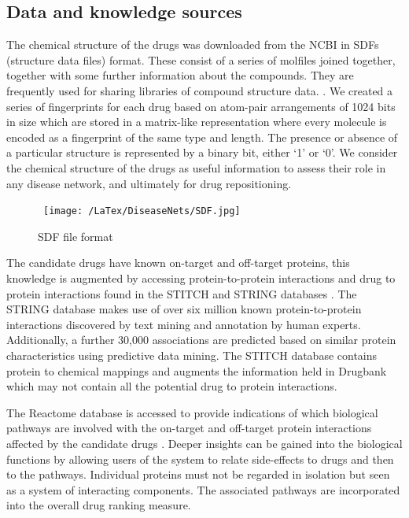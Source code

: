 \documentclass[authoryear,10pt,preprint]{elsarticle}
\begin{document}
\subsection{Data and knowledge sources}
The chemical structure of the drugs was downloaded from the NCBI in SDFs (structure data files) format. These consist of a series of molfiles joined together, together with some further information about the compounds. They are frequently used for sharing libraries of compound structure data. \cite{Weininger1988}. We created a series of fingerprints for each drug based on atom-pair arrangements of 1024 bits in size which are stored in a matrix-like representation where every molecule is encoded as a fingerprint of the same type and length. The presence or absence of a particular structure is represented by a binary bit, either `1' or `0'. We consider the chemical structure of the drugs as useful information to assess their role in any disease network, and ultimately for drug repositioning.

\begin{figure}[ht]
  \begin{center}              %
    \  \texttt{[image: /LaTex/DiseaseNets/SDF.jpg]} %
  \end{center}
 \caption{SDF file format}
\label{sdf}
\end{figure}



The candidate drugs have known on-target and off-target proteins, this knowledge is augmented by accessing protein-to-protein interactions and drug to protein interactions found in the STITCH and STRING databases \cite{Kuhn2012}. The STRING database  makes use of over six million known protein-to-protein interactions discovered by text mining and annotation by human experts. Additionally,  a further 30,000 associations are predicted based on similar protein characteristics using predictive data mining. The STITCH database contains protein to chemical mappings and augments the information held in Drugbank which may not contain all the potential drug to protein interactions. 

The Reactome database is accessed to provide indications of which biological pathways are involved with the on-target and off-target protein interactions affected by the candidate drugs \cite{Yu2015c}. Deeper insights can be gained into the biological functions by allowing users of the system to relate side-effects to drugs and then to the pathways. Individual proteins must not be regarded in isolation but seen as a system of interacting components. The associated pathways are incorporated into the overall drug ranking measure.
\end{document}
